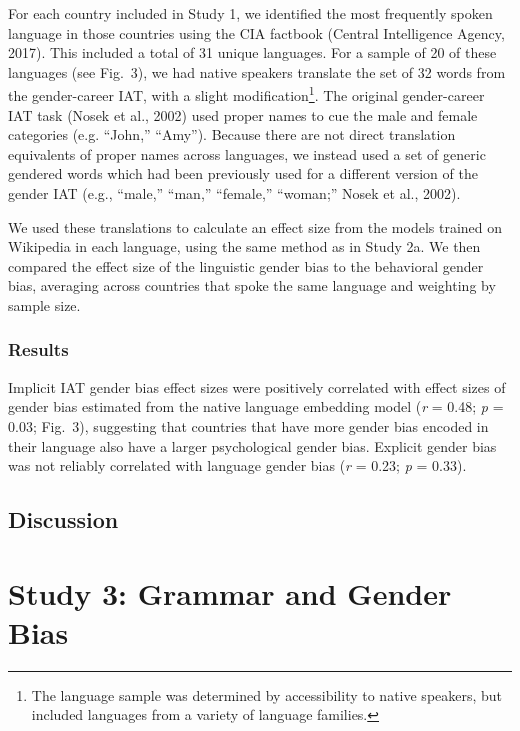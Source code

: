 \documentclass[10pt, letterpaper]{article}
\begin{document}
For each country included in Study 1, we identified the most frequently
spoken language in those countries using the CIA factbook (Central
Intelligence Agency, 2017). This included a total of 31 unique
languages. For a sample of 20 of these languages (see Fig.~3), we had
native speakers translate the set of 32 words from the gender-career
IAT, with a slight
modification\footnote{The language sample was determined by accessibility to native speakers, but included languages from a variety of language families.}.
The original gender-career IAT task (Nosek et al., 2002) used proper
names to cue the male and female categories (e.g. ``John,'' ``Amy'').
Because there are not direct translation equivalents of proper names
across languages, we instead used a set of generic gendered words which
had been previously used for a different version of the gender IAT
(e.g., ``male,'' ``man,'' ``female,'' ``woman;'' Nosek et al., 2002).

We used these translations to calculate an effect size from the models
trained on Wikipedia in each language, using the same method as in Study
2a. We then compared the effect size of the linguistic gender bias to
the behavioral gender bias, averaging across countries that spoke the
same language and weighting by sample size.

\subsubsection{Results}\label{results-2}

Implicit IAT gender bias effect sizes were positively correlated with
effect sizes of gender bias estimated from the native language embedding
model (\emph{r} = 0.48; \emph{p} = 0.03; Fig.~3), suggesting that
countries that have more gender bias encoded in their language also have
a larger psychological gender bias. Explicit gender bias was not
reliably correlated with language gender bias (\emph{r} = 0.23; \emph{p}
= 0.33).

\subsection{Discussion}\label{discussion-1}

\section{Study 3: Grammar and Gender
Bias}\label{study-3-grammar-and-gender-bias}
\end{document}

